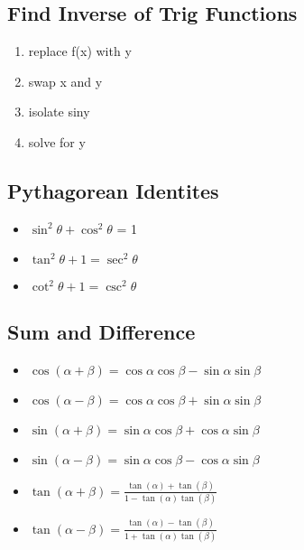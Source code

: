 \documentclass{report}
\begin{document}
      \subsection{Find Inverse of Trig Functions}
        \begin{enumerate}
          \item replace f(x) with y
          \item swap x and y
          \item isolate siny
          \item solve for y
        \end{enumerate}

      \bigbreak \noindent \bigbreak \noindent 
      \subsection{Pythagorean Identites}
      \begin{itemize}
        \item $ \sin^{2}{\theta} + \cos^{2}{\theta}$ = 1
        \item $\tan^{2}{\theta} +1 = \sec^{2}{\theta}$
        \item $\cot^{2}{\theta } + 1 = \csc^{2}{\theta }$
      \end{itemize}

      \bigbreak \noindent \bigbreak \noindent 
      \subsection{Sum and Difference}
      \begin{itemize}
        \item $\cos{(\alpha + \beta)} = \cos{\alpha}\cos{\beta} - \sin{\alpha}\sin{\beta}$
        \item $\cos{(\alpha - \beta)} = \cos{\alpha}\cos{\beta} + \sin{\alpha}\sin{\beta}$
        \item $\sin{(\alpha + \beta)} = \sin{\alpha}\cos{\beta} + \cos{\alpha}\sin{\beta}$
        \item $\sin{(\alpha - \beta)} = \sin{\alpha}\cos{\beta} - \cos{\alpha}\sin{\beta}$
        \item $\tan{(\alpha + \beta)} = \frac{\tan(\alpha) + \tan(\beta)}{1-\tan(\alpha)\tan(\beta)} $
        \item $\tan{(\alpha - \beta)} = \frac{\tan(\alpha) - \tan(\beta)}{1+\tan(\alpha)\tan(\beta)} $
      \end{itemize}

      \bigbreak \noindent \bigbreak \noindent 
\end{document}
